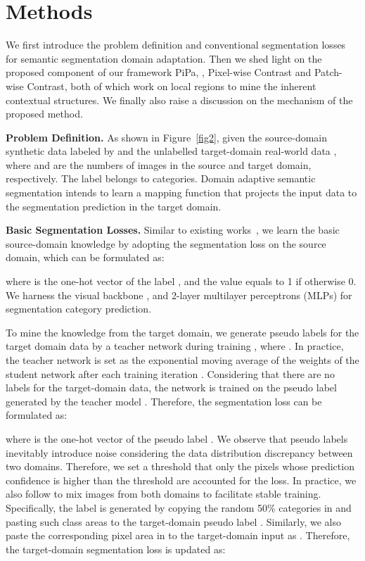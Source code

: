 \documentclass[10pt,twocolumn,letterpaper]{article}
\begin{document}
\section{Methods}
We first introduce the problem definition and conventional segmentation losses for semantic segmentation domain adaptation. Then we shed light on the proposed component of our framework PiPa, \ie, Pixel-wise Contrast and Patch-wise Contrast, both of which work on local regions to mine the inherent contextual structures. We finally also raise a discussion on the mechanism of the proposed method.



\noindent\textbf{Problem Definition.} 
As shown in Figure~\ref{fig2}, given the source-domain synthetic data  labeled by  and the unlabelled target-domain real-world data  
, where  and  are the numbers of images in the source and target domain, respectively. The label  belongs to  categories.
Domain adaptive semantic segmentation intends to learn a mapping function that projects the input data  to the segmentation prediction  in the target domain. 









\noindent\textbf{Basic Segmentation Losses.}  Similar to existing works~\cite{zheng2019unsupervised,zou2019confidence}, we learn the basic source-domain knowledge by adopting the segmentation loss on the source domain, which can be formulated as:

where  is the one-hot vector of the label , and the value  equals to 1 if  otherwise 0. 
We harness the visual backbone , and 2-layer multilayer perceptrons (MLPs)  for segmentation category prediction.

To mine the knowledge from the target domain, we generate pseudo labels   for the target domain data  by a teacher network  during training \cite{WilhelmTranheden2020DACSDA, zhou2022context}, where . 
In practice, the teacher network  is set as the exponential moving average of the weights of the student network  after each training iteration \cite{tarvainen2017mean,zheng2022adaptive}. Considering that there are no labels for the target-domain data, the network  is trained on the pseudo label  generated by the teacher model . Therefore, the segmentation loss can be formulated as:

where  is the one-hot vector of the pseudo label .
We observe that pseudo labels inevitably introduce noise considering the data distribution discrepancy between two domains. Therefore, we set a threshold that only the pixels whose prediction confidence is higher than the threshold are accounted for the loss.
In practice, we also follow \cite{WilhelmTranheden2020DACSDA, hoyer2022daformer} to mix images from both domains to facilitate stable training. Specifically, the label  is generated by copying the random 50\% categories in  and pasting such class areas to the target-domain pseudo label . Similarly, we also paste the corresponding pixel area in  to the target-domain input  as .
Therefore, the target-domain segmentation loss is updated as:  
\end{document}
